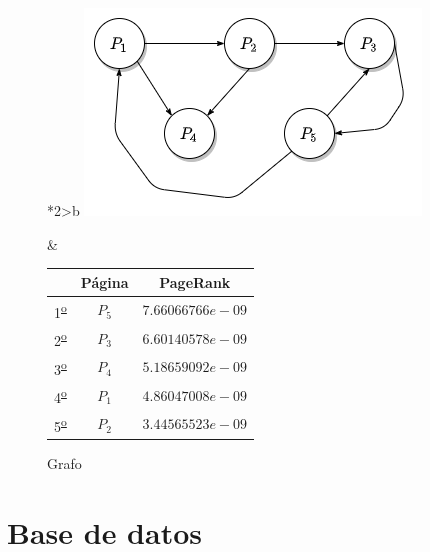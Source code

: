 \documentclass[size=a4, parskip=half, titlepage=false, toc=flat, toc=bib, 12pt]{scrartcl}
\theoremstyle{theorem-style}
\theoremstyle{definition-style}
\theoremstyle{remark-style}
\theoremstyle{example-style}
\theoremstyle{definition-style}
\theoremstyle{remark-style}
\begin{document}
\begin{figure}[!ht]
  \begin{tabular}{*{2}{>{\centering\arraybackslash}b{}}}
  \centering
    \includegraphics[scale=0.5]{./img/grafoej7}
    \caption{Grafo}
    &
      \renewcommand{\arraystretch}{1.3}
      \begin{tabular}{ccc}
        & Página & PageRank         \\ \hline
      1\textsuperscript{\underline{o}}} & $P_5$  & $7.66066766e-09$ \\ \hline
      2\textsuperscript{\underline{o}}} & $P_3$  & $6.60140578e-09$ \\ \hline
      3\textsuperscript{\underline{o}}} & $P_4$  & $5.18659092e-09$ \\ \hline
      4\textsuperscript{\underline{o}}} & $P_1$  & $4.86047008e-09$ \\ \hline
      5\textsuperscript{\underline{o}}} & $P_2$  & $3.44565523e-09$ \\ \hline
      \end{tabular}
    \end{tabular}
\end{figure}

\newpage

\section{Base de datos}
\end{document}
